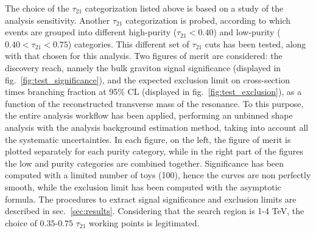 
\noindent The choice of the $\tau_{21}$ categorization listed above is based on a study of the analysis sensitivity. Another $\tau_{21}$ categorization is probed, according to which events are grouped into different high-purity ($\tau_{21} < 0.40$) and low-purity ($0.40 < \tau_{21} < 0.75$) categories. This different set of $\tau_{21}$ cuts has been tested, along with that chosen for this analysis. Two figures of merit are considered: the discovery reach, namely the bulk graviton signal significance (displayed in fig.~\ref{fig:test_significance}), and the expected exclusion limit on cross-section times branching fraction at 95\% CL (displayed in fig.~\ref{fig:test_exclusion}), as a function of the reconstructed transverse mass of the resonance. To this purpose, the entire analysis workflow has been applied, performing an unbinned shape analysis with the analysis background estimation method, taking into account all the systematic uncertainties. In each figure, on the left, the figure of merit is plotted separately for each purity category, while in the right part of the figures the low and purity categories are combined together. Significance has been computed with a limited number of toys (100), hence the curves are non perfectly smooth, while the exclusion limit has been computed with the asymptotic formula. The procedures to extract signal significance and exclusion limits are described in sec.~\ref{sec:results}. Considering that the search region is 1-4 TeV, the choice of $0.35$-$0.75$ $\tau_{21}$ working points is legitimated.

